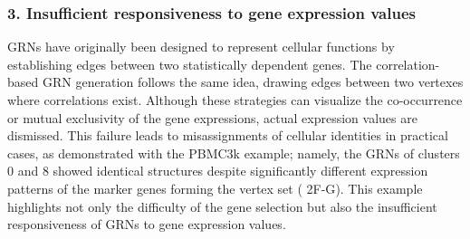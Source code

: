 \documentclass{article}
\begin{document}
\subsubsection*{3. Insufficient responsiveness to gene expression values}
GRNs have originally been designed to represent cellular functions by establishing edges between two statistically 
dependent genes. The correlation-based GRN generation follows the same idea, drawing edges between two vertexes 
where correlations exist. Although these strategies can visualize the co-occurrence or mutual exclusivity of the gene 
expressions, actual expression values are dismissed. This failure leads to misassignments of cellular identities in 
practical cases, as demonstrated with the PBMC3k example; namely, the GRNs of clusters 0 and 8 showed identical 
structures despite significantly different expression patterns of the marker genes forming the vertex set (\figurename{ 2F-G}). 
This example highlights not only the difficulty of the gene selection but also the insufficient responsiveness 
of GRNs to gene expression values.
\end{document}

